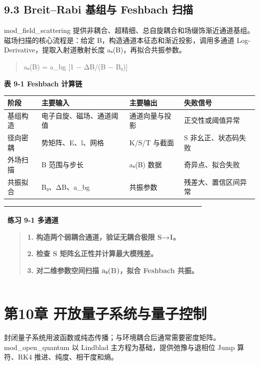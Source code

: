 \documentclass[UTF8,openany,11pt,fontset=fandol]{ctexbook}
\begin{document}
\section{\texorpdfstring{\textbf{9.3 Breit--Rabi 基组与 Feshbach
扫描}}{9.3 Breit--Rabi 基组与 Feshbach 扫描}}\label{breitrabi-ux57faux7ec4ux4e0e-feshbach-ux626bux63cf}

mod\_field\_scattering
提供非耦合、超精细、总自旋耦合和场缀饰渐近通道基组。磁场扫描的核心流程是：给定
B，构造通道本征态和渐近投影，调用多通道
Log-Derivative，提取入射道散射长度 aₛ(B)，再拟合共振参数。

\begin{quote}
aₛ(B) = a\_bg {[}1 − ΔB/(B − B₀){]}
\end{quote}

\textbf{表 9-1 Feshbach 计算链}

\begin{longtable}[]{@{}llll@{}}
\toprule
\textbf{阶段} & \textbf{主要输入} & \textbf{主要输出} &
\textbf{失败信号}\tabularnewline
\midrule
\endhead
基组构造 & 电子自旋、磁场、通道阈值 & 通道向量与投影 &
正交性或阈值异常\tabularnewline
径向密耦 & 势矩阵、E、l、网格 & K/S/T 与截面 & S
非幺正、状态码失败\tabularnewline
外场扫描 & B 范围与步长 & aₛ(B) 数据 & 奇异点、拟合失败\tabularnewline
共振拟合 & B₀、ΔB、a\_bg & 共振参数 &
残差大、置信区间异常\tabularnewline
\bottomrule
\end{longtable}

\begin{longtable}[]{@{}l@{}}
\toprule
\endhead
\begin{minipage}[t]{0.97\columnwidth}\raggedright
\textbf{练习 9-1 多通道}

\begin{quote}
1. 构造两个弱耦合通道，验证无耦合极限 S→I。

2. 检查 S 矩阵幺正性并计算最大模残差。

3. 对二维参数空间扫描 aₛ(B)，拟合 Feshbach 共振。
\end{quote}\strut
\end{minipage}\tabularnewline
\bottomrule
\end{longtable}

\chapter{第10章 开放量子系统与量子控制}\label{ux7b2c10ux7ae0-ux5f00ux653eux91cfux5b50ux7cfbux7edfux4e0eux91cfux5b50ux63a7ux5236}

封闭量子系统用波函数或纯态传播；与环境耦合后通常需要密度矩阵。mod\_open\_quantum
以 Lindblad 主方程为基础，提供弛豫与退相位 Jump 算符、RK4
推进、纯度、相干度和熵。
\end{document}
